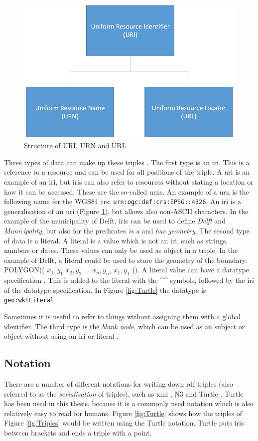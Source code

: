 \begin{figure}
	\centering
	\includegraphics[width=0.6\linewidth]{figs/URI.png}
	\caption{Structure of URI, URN and URL}
	\label{fig:URI}
\end{figure}

\begin{sloppypar}
Three types of data can make up these triples \citep{LD:W3C6}. The first type is an \ac{iri}. This is a reference to a resource and can be used for all positions of the triple. A \acf{url} is an example of an \ac{iri}, but \ac{iri}s can also refer to resources without stating a location or how it can be accessed. These are the so-called \acp{urn}. An example of a \ac{urn} is the following name for the WGS84 \ac{crs}: \texttt{urn:ogc:def:crs:EPSG::4326}. An \ac{iri} is a generalisation of an \ac{uri} (Figure \ref{fig:URI}), but allows also non-ASCII characters. In the example of the municipality of Delft, \ac{iri}s can be used to define \textit{Delft} and \textit{Municipality}, but also for the predicates \textit{is a} and \textit{has geometry}. The second type of data is a literal. A literal is a value which is not an \ac{iri}, such as strings, numbers or dates. These values can only be used as object in a triple. In the example of Delft, a literal could be used to store the geometry of the boundary: POLYGON(( $x_{1},y_{1}$ $x_{2},y_{2}$ ... $x_{n},y_{n}$, $x_{1},y_{1}$ )). A literal value can have a datatype specification \citep{LD:W3C7}. This is added to the literal with the \^{}\^{} symbols, followed by the \ac{iri} of the datatype specification. In Figure \ref{fig:Turtle} the datatype is \texttt{geo:wktLiteral}.
\end{sloppypar}

Sometimes it is useful to refer to things without assigning them with a global identifier. The third type is the \textit{blank node}, which can be used as an subject or object without using an \ac{iri} or literal \citep{LD:W3C6}.  


\subsection{Notation}
\label{par:notation}
There are a number of different notations for writing down \ac{rdf} triples (also referred to as the \textit{serialisation} of triples), such as \ac{xml} \citep{LD:W3C3}, N3 \citep{LD:W3C5} and Turtle \citep{LD:W3C4}. Turtle has been used in this thesis, because it is a commonly used notation which is also relatively easy to read for humans. Figure \ref{fig:Turtle} shows how the triples of Figure \ref{fig:Triples} would be written using the Turtle notation. Turtle puts \acp{iri} between brackets and ends a triple with a point. 

